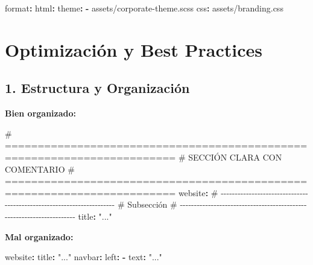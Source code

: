 \documentclass[
  doc,
  floatsintext,
  longtable,
  a4paper,
  nolmodern,
  notxfonts,
  notimes,
  12pt,
  colorlinks=true,linkcolor=blue,citecolor=blue,urlcolor=blue]{apa7}
\newenvironment{Shaded}{\begin{snugshade}}{\end{snugshade}}
\newcommand{\AttributeTok}[1]{\textcolor[rgb]{0.40,0.45,0.13}{#1}}
\newcommand{\CommentTok}[1]{\textcolor[rgb]{0.37,0.37,0.37}{#1}}
\newcommand{\FunctionTok}[1]{\textcolor[rgb]{0.28,0.35,0.67}{#1}}
\newcommand{\KeywordTok}[1]{\textcolor[rgb]{0.00,0.23,0.31}{\textbf{#1}}}
\newcommand{\StringTok}[1]{\textcolor[rgb]{0.13,0.47,0.30}{#1}}
\begin{document}
\begin{Shaded}
\begin{Highlighting}[]
\FunctionTok{format}\KeywordTok{:}
\AttributeTok{  }\FunctionTok{html}\KeywordTok{:}
\AttributeTok{    }\FunctionTok{theme}\KeywordTok{:}
\AttributeTok{      }\KeywordTok{{-}}\AttributeTok{ assets/corporate{-}theme.scss}
\AttributeTok{    }\FunctionTok{css}\KeywordTok{:}\AttributeTok{ assets/branding.css}
\end{Highlighting}
\end{Shaded}

\section{Optimización y Best
Practices}\label{optimizaciuxf3n-y-best-practices}

\subsection{1. Estructura y
Organización}\label{estructura-y-organizaciuxf3n}

\textbf{Bien organizado:}

\begin{Shaded}
\begin{Highlighting}[]
\CommentTok{\# ========================================================================}
\CommentTok{\# SECCIÓN CLARA CON COMENTARIO}
\CommentTok{\# ========================================================================}
\FunctionTok{website}\KeywordTok{:}
\CommentTok{  \# {-}{-}{-}{-}{-}{-}{-}{-}{-}{-}{-}{-}{-}{-}{-}{-}{-}{-}{-}{-}{-}{-}{-}{-}{-}{-}{-}{-}{-}{-}{-}{-}{-}{-}{-}{-}{-}{-}{-}{-}{-}{-}{-}{-}{-}{-}{-}{-}{-}{-}{-}{-}{-}{-}{-}{-}{-}{-}{-}{-}{-}{-}{-}{-}{-}{-}{-}{-}{-}{-}}
\CommentTok{  \# Subsección}
\CommentTok{  \# {-}{-}{-}{-}{-}{-}{-}{-}{-}{-}{-}{-}{-}{-}{-}{-}{-}{-}{-}{-}{-}{-}{-}{-}{-}{-}{-}{-}{-}{-}{-}{-}{-}{-}{-}{-}{-}{-}{-}{-}{-}{-}{-}{-}{-}{-}{-}{-}{-}{-}{-}{-}{-}{-}{-}{-}{-}{-}{-}{-}{-}{-}{-}{-}{-}{-}{-}{-}{-}{-}}
\AttributeTok{  }\FunctionTok{title}\KeywordTok{:}\AttributeTok{ }\StringTok{"..."}
\end{Highlighting}
\end{Shaded}

\textbf{Mal organizado:}

\begin{Shaded}
\begin{Highlighting}[]
\FunctionTok{website}\KeywordTok{:}
\FunctionTok{title}\KeywordTok{:}\AttributeTok{ }\StringTok{"..."}
\FunctionTok{navbar}\KeywordTok{:}
\FunctionTok{left}\KeywordTok{:}
\KeywordTok{{-}}\AttributeTok{ }\FunctionTok{text}\KeywordTok{:}\AttributeTok{ }\StringTok{"..."}
\end{Highlighting}
\end{Shaded}
\end{document}
